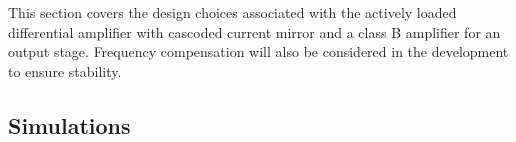 


This section covers the design choices associated with the actively loaded differential amplifier with cascoded current mirror and a class B amplifier for an output stage. Frequency compensation will also be considered in the development to ensure stability.

\subsection{Simulations}
%



